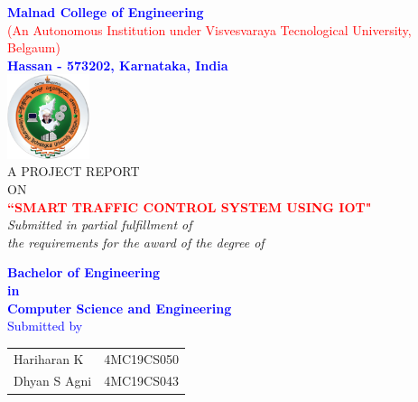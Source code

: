 \begin{titlepage}

\begin{center}
\thispagestyle{empty}
\thisfancypage{%
  \setlength{\fboxsep}{10pt}\doublebox}{}

\vspace*{1\baselineskip}

\textcolor{Blue}{\LARGE{\textbf{Malnad College of Engineering}} }\\ 
\textcolor{Red}{\small{(An Autonomous Institution under Visvesvaraya Tecnological University, Belgaum)}}\\
\textcolor{Blue}{\large{\textbf{Hassan - 573202, Karnataka, India}}}\\[0.2in]

\includegraphics[width=0.18\textwidth]{./vtu_new.png}\\[0.2in]

\Large{\small{A PROJECT REPORT \\ ON}}\\
\textcolor{Red}{\Large{\textsc {\textbf{``SMART TRAFFIC CONTROL SYSTEM USING IOT"}}}}\\[0.1cm]
\small \emph{Submitted in partial fulfillment of\\
        the requirements for the award of the degree of}
        \vspace{.2in}

       \textcolor{Blue}{{\bf Bachelor of Engineering \\in\\ Computer Science and Engineering}}\\[0.25cm]

\vspace{.2in}					
\textcolor{Blue}{\normalsize Submitted by }\\

\begin{table}[h]
\centering
\begin{tabular}{lr}
\color{Blue}Hariharan K & \color{Red}4MC19CS050 \\
\color{Blue}Dhyan S Agni & \color{Red}4MC19CS043 \\ 
\end{tabular}
\end{table}



\end{center}
\end{titlepage}
